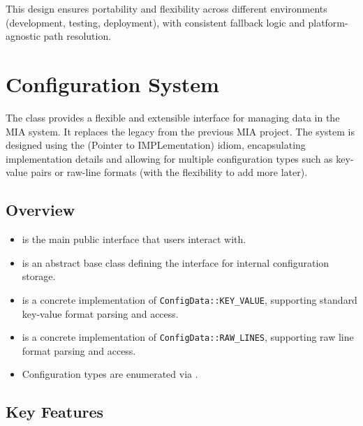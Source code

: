 This design ensures portability and flexibility across different environments (development, testing, deployment), with consistent fallback logic and platform-agnostic path resolution.




















\section{Configuration System}\label{section:configuration_system}

The  class provides a flexible and extensible interface for managing  data in the MIA system. It replaces the legacy  from the previous MIA project. The system is designed using the  (Pointer to IMPLementation) idiom, encapsulating implementation details and allowing for multiple configuration types such as key-value pairs or raw-line formats (with the flexibility to add more later).

\subsection{Overview}

\begin{itemize}\itemsep0em
	\item {} is the main public interface that users interact with.
	\item {} is an abstract base class defining the interface for internal configuration storage.
	\item {} is a concrete implementation of \texttt{ConfigData::KEY\_VALUE}, supporting standard key-value format parsing and access.
	\item {} is a concrete implementation of \texttt{ConfigData::RAW\_LINES}, supporting raw line format parsing and access.
	\item Configuration types are enumerated via .
\end{itemize}

\subsection{Key Features}

